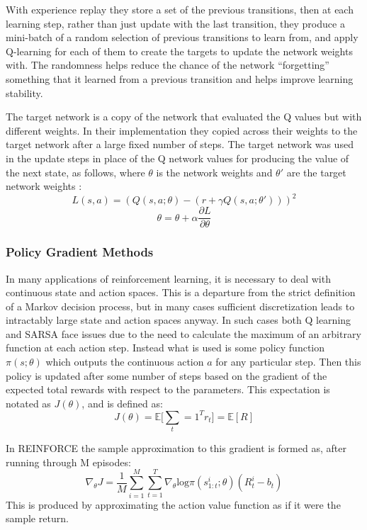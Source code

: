 With experience replay they store a set of the previous transitions, then at each learning step, rather than just update with the last transition, they produce a mini-batch of a random selection of previous transitions to learn from, and apply Q-learning for each of them to create the targets to update the network weights with. The randomness helps reduce the chance of the network ``forgetting'' something that it learned from a previous transition and helps improve learning stability. 

The target network is a copy of the network that evaluated the Q values  but with different weights. In their implementation they copied across their weights to the target network after a large fixed number of steps. The target network was used in the update steps in place of the Q network values for producing the value of the next state, as follows, where $\theta$ is the network weights and $\theta'$ are the target network weights :
\begin{equation*}
L(s,a) = (Q(s,a;\theta) - (r + \gamma Q(s,a; \theta' )))^2
\end{equation*}
\begin{equation}
\theta = \theta + \alpha \frac{\partial L}{\partial \theta}
\end{equation}

\subsubsection{Policy Gradient Methods}
In many applications of reinforcement learning, it is necessary to deal with continuous state and action spaces. This is a departure from the strict definition of a Markov decision process, but in many cases sufficient discretization leads to intractably large state and action spaces anyway. In such cases both Q learning and SARSA face issues due to the need to calculate the maximum of an arbitrary function at each action step. Instead what is used is some policy function $\pi(s;\theta)$ which outputs the continuous action $a$ for any particular step. Then this policy is updated after some number of steps based on the gradient of the expected total rewards with respect to the parameters. This expectation is notated as $J(\theta)$, and is defined as:
\begin{equation}
J(\theta) = \mathbb{E}\big[\sum_t=1^T r_t \big] = \mathbb{E}[R]
\end{equation}

In REINFORCE the sample approximation to this gradient is formed as, after running through M episodes:
\begin{equation}
\nabla_\theta J = \frac{1}{M}\sum_{i=1}^M\sum_{t=1}^T\nabla_\theta  \text{log}\pi ( s_{1:t}^i ; \theta)(R^i_t - b_t)
\label{eq:Reinforce}
\end{equation}
This is produced by approximating the action value function as if it were the sample return.

